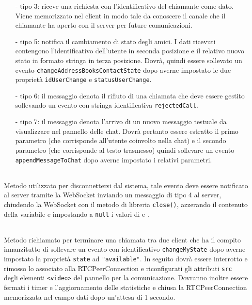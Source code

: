 \begin{description}
\begin{itemize}
\begin{itemize}
       \item[-] tipo 3: riceve una richiesta con l'identificativo del chiamante come dato. Viene memorizzato nel client in modo tale da conoscere il canale che il chiamante ha aperto con il server per future comunicazioni.
      \item[-] tipo 5: notifica il cambiamento di stato degli amici. I dati ricevuti contengono l'identificativo dell'utente in seconda posizione e il relativo nuovo stato in formato stringa in terza posizione. Dovrà, quindi essere sollevato un evento \verb'changeAddressBooksContactState' dopo averne impostato le due proprietà \verb'idUserChange' e \verb'statusUserChange'.
      \item[-] tipo 6: il messaggio denota il rifiuto di una chiamata che deve essere gestito sollevando un evento con stringa identificativa \verb'rejectedCall'.
      \item[-] tipo 7: il messaggio denota l'arrivo di un nuovo messaggio testuale da visualizzare nel pannello delle chat. Dovrà pertanto essere estratto il primo parametro (che corrisponde all'utente coinvolto nella chat) e il secondo parametro (che corrisponde al testo trasmesso) quindi sollevare un evento \verb'appendMessageToChat' dopo averne impostato i relativi parametri.
    \end{itemize}
  \end{itemize}
  
  \item{}\\
  Metodo utilizzato per disconnettersi dal sistema, tale evento deve essere notificato al server tramite la WebSocket inviando un messaggio di tipo 4 al server, chiudendo la WebSocket con il metodo di libreria \verb'close()', azzerando il contenuto della variabile  e impostando a \verb'null' i valori di  e .

  \item{}\\
  Metodo richiamato per terminare una chiamata tra due client che ha il compito innanzitutto di sollevare un evento con identificativo \verb'changeMyState' dopo averne impostato la proprietà \verb'state' ad \verb'"available"'. In seguito dovrà essere interrotto e rimosso lo  associato alla RTCPeerConnection e riconfigurati gli attributi \verb'src' degli elementi \verb'<video>' del pannello per la comunicazione. Dovranno inoltre essere fermati i timer e l'aggiornamento delle statistiche e chiusa la RTCPeerConnection memorizzata nel campo dati  dopo un'attesa di 1 secondo.
  

\end{description}
